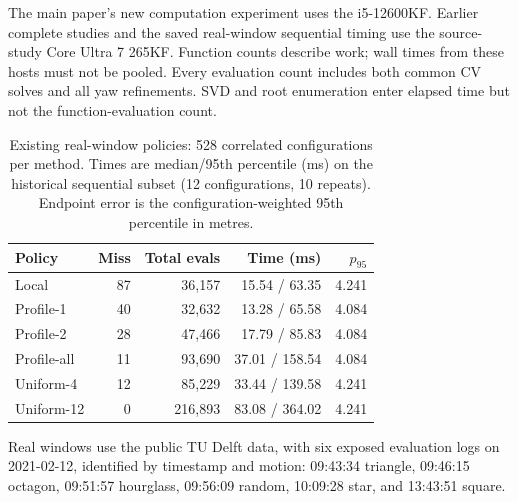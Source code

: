 \documentclass[conference,letterpaper,10pt]{IEEEtran}
\begin{document}
The main paper's new computation experiment uses the i5-12600KF. Earlier complete studies and the saved real-window sequential timing use the source-study Core Ultra 7 265KF. Function counts describe work; wall times from these hosts must not be pooled. Every evaluation count includes both common CV solves and all yaw refinements. SVD and root enumeration enter elapsed time but not the function-evaluation count.

\begin{table}[t]
\caption{Existing real-window policies: 528 correlated configurations per method. Times are median/95th percentile (ms) on the historical sequential subset (12 configurations, 10 repeats). Endpoint error is the configuration-weighted 95th percentile in metres.}
\centering
\setlength{\tabcolsep}{3.4pt}
\begin{tabular}{lrrrr}
\toprule
Policy&Miss&Total evals&Time (ms)&$p_{95}$\\
\midrule
Local&87&36,157&15.54 / 63.35&4.241\\
Profile-1&40&32,632&13.28 / 65.58&4.084\\
Profile-2&28&47,466&17.79 / 85.83&4.084\\
Profile-all&11&93,690&37.01 / 158.54&4.084\\
Uniform-4&12&85,229&33.44 / 139.58&4.241\\
Uniform-12&0&216,893&83.08 / 364.02&4.241\\
\bottomrule
\end{tabular}
\end{table}

Real windows use the public TU Delft data\cite{pfeifferdata2021}, with six exposed evaluation logs on 2021-02-12, identified by timestamp and motion: 09:43:34 triangle, 09:46:15 octagon, 09:51:57 hourglass, 09:56:09 random, 10:09:28 star, and 13:43:51 square.



\end{document}
